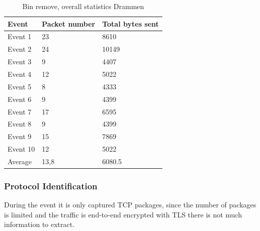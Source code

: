 \begin{table}[H]
\centering
\caption{Bin remove, overall statistics Drammen }
\label{tab:BRoverallDRA}
\begin{tabular}{|l|l|l|}
\hline
\textbf{Event} & \textbf{Packet number} & \textbf{Total bytes sent} \\ \hline
Event 1        & 23                     & 8610                      \\ \hline
Event 2        & 24                     & 10149                     \\ \hline
Event 3        & 9                      & 4407                      \\ \hline
Event 4        & 12                     & 5022                      \\ \hline
Event 5        & 8                      & 4333                      \\ \hline
Event 6        & 9                      & 4399                      \\ \hline
Event 7        & 17                     & 6595                      \\ \hline
Event 8        & 9                      & 4399                      \\ \hline
Event 9        & 15                     & 7869                      \\ \hline
Event 10       & 12                     & 5022                      \\ \hline
Average        & 13,8                   & 6080.5                    \\ \hline
\end{tabular}
\end{table}

\subsubsection{Protocol Identification}
During the event it is only captured TCP packages, since the number of packages is limited and the traffic is end-to-end encrypted with TLS there is not much information to extract. 
